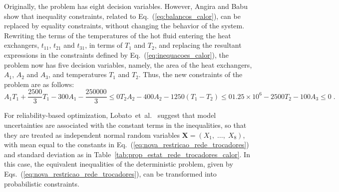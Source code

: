 \documentclass[final,5p,times,twocolumn,numbers]{elsarticle}
\begin{document}
Originally, the problem has eight decision variables. However, Angira and Babu~\cite{bib:angira2002} show that inequality constraints, related to Eq.~(\ref{eq:balancos_calor}), can be replaced by equality constraints, without changing the behavior of the system. Rewriting the terms of the temperatures of the hot fluid entering the heat exchangers, $ t_{11} $, $ t_{21} $ and $ t_{31} $, in terms of $ T_{1} $ and $ T_{2} $, and replacing the resultant expressions in the constraints defined by Eq.~(\ref{eq:inequacoes_calor}), the problem now has five decision variables, namely, the area of the heat exchangers, $ A_{1} $, $ A_{2} $ and $ A_{3} $, and temperatures $ T_{1} $ and $ T_{2} $. Thus, the new constraints of the problem are as follows:
%
\begin{subequations} \label{eq:nova_restricao_rede_trocadores}
\begin{equation} \label{eq:nova_restricao_rede_trocadores_1}
A_{1} T_{1} + \dfrac{2500}{3} T_{1} - 300 A_{1} - \dfrac{250000}{3} \leq 0
\end{equation}
%
\begin{equation}
T_{2} A_{2} - 400 A_{2} - 1250 \left( T_{1} - T_{2} \right) \leq 0
\end{equation}
%
\begin{equation} \label{eq:nova_restricao_rede_trocadores_3}
1.25 \times 10^{6} - 2500 T_{2} - 100 A_{3} \leq 0 \; .
\end{equation}
\end{subequations}

For reliability-based optimization, Lobato~et~al.~\cite{bib:lobato2019} suggest that model uncertainties are associated with the constant terms in the inequalities, so that they are treated as independent normal random variables $ \mathbf{X} = \left( X_{1}, \; \dots, \; X_{8} \right) $, with mean equal to the constants in Eq.~(\ref{eq:nova_restricao_rede_trocadores}) and standard deviation as in Table~\ref{tab:prop_estat_rede_trocadores_calor}. In this case, the equivalent inequalities of the deterministic problem, given by Eqs.~(\ref{eq:nova_restricao_rede_trocadores}), can be transformed into probabilistic constraints.
\end{document}

